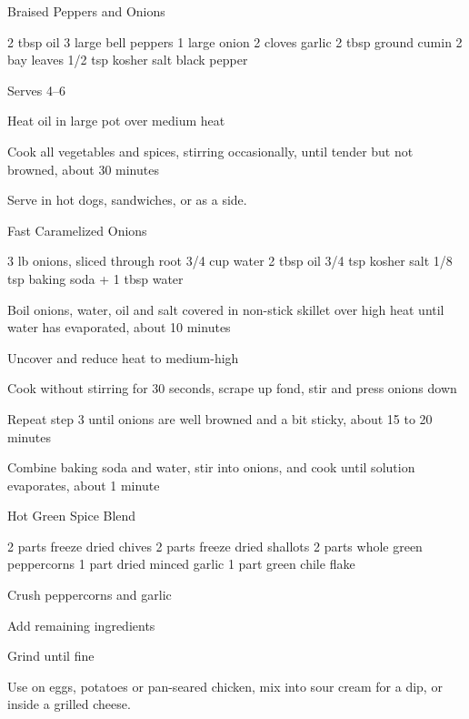 
\begin{recipe}{Braised Peppers and Onions}{\vegetarian{}}
\begin{ingredients}
2 tbsp oil
3 large bell peppers
1 large onion
2 cloves garlic
2 tbsp ground cumin
2 bay leaves
1/2 tsp kosher salt
black pepper
\end{ingredients}
\nextcolumn
Serves 4--6
\begin{steps}
    \item Heat oil in large pot over medium heat
    \item Cook all vegetables and spices, stirring occasionally, until tender but not browned, about 30 minutes
\end{steps}
Serve in hot dogs, sandwiches, or as a side.
\end{recipe}

\begin{recipe}{Fast Caramelized Onions}{\vegetarian{}}
\begin{ingredients}
3 lb onions, sliced \ibreak through root
3/4 cup water
2 tbsp oil
3/4 tsp kosher salt
1/8 tsp baking soda + 1 tbsp water
\end{ingredients}
\nextcolumn
\begin{steps}
    \item Boil onions, water, oil and salt covered in non-stick skillet over high heat until water has evaporated, about 10 minutes
    \item Uncover and reduce heat to medium-high
    \item Cook without stirring for 30 seconds, scrape up fond, stir and press onions down
    \item Repeat step 3 until onions are well browned and a bit sticky, about 15 to 20 minutes
    \item Combine baking soda and water, stir into onions, and cook until solution evaporates, about 1 minute
\end{steps}
\end{recipe}

\begin{recipe}{Hot Green Spice Blend}{\vegetarian{}}
\begin{ingredients}
2 parts freeze dried chives
2 parts freeze dried shallots
2 parts whole green peppercorns
1 part dried minced garlic
1 part green chile flake
\end{ingredients}
\nextcolumn
\begin{steps}
    \item Crush peppercorns and garlic
    \item Add remaining ingredients
    \item Grind until fine
\end{steps}
Use on eggs, potatoes or pan-seared chicken, mix into sour cream for a dip, or inside a grilled cheese.
\end{recipe}

